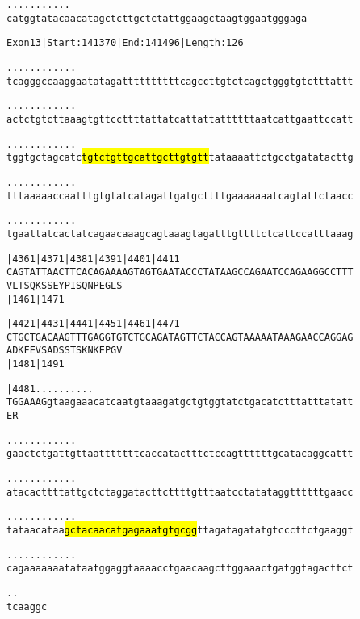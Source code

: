 \documentclass{article}
\begin{document}
\newpage
\begin{alltt}
 .    .    .    .    .    .    .    .    .    .    .
catggtatacaacatagctcttgctctattggaagctaagtggaatgggaga
\end{alltt}
\newpage
\begin{alltt}
Exon 13 | Start: 141370 | End: 141496 | Length: 126

.    .    .    .    .    .    .    .    .    .    .    .    
tcagggccaaggaatatagattttttttttcagccttgtctcagctgggtgtctttattt

.    .    .    .    .    .    .    .    .    .    .    .    
actctgtcttaaagtgttccttttattatcattattattttttaatcattgaattccatt

.    .    .    .    .    .    .    .    .    .    .    .    
tggtgctagcatc\hl{tgtctgttgcattgcttgtgtt}tataaaattctgcctgatatacttg

.    .    .    .    .    .    .    .    .    .    .    .    
tttaaaaaccaatttgtgtatcatagattgatgcttttgaaaaaaatcagtattctaacc

.    .    .    .    .    .    .    .    .    .    .    .    
tgaattatcactatcagaacaaagcagtaaagtagatttgttttctcattccatttaaag

   |4361     |4371     |4381     |4391     |4401     |4411  
CAGTATTAACTTCACAGAAAAGTAGTGAATACCCTATAAGCCAGAATCCAGAAGGCCTTT
  V  L  T  S  Q  K  S  S  E  Y  P  I  S  Q  N  P  E  G  L  S
                       |1461                         |1471  

   |4421     |4431     |4441     |4451     |4461     |4471  
CTGCTGACAAGTTTGAGGTGTCTGCAGATAGTTCTACCAGTAAAAATAAAGAACCAGGAG
  A  D  K  F  E  V  S  A  D  S  S  T  S  K  N  K  E  P  G  V
                       |1481                         |1491  

   |4481   .    .    .    .    .    .    .    .    .    .   
TGGAAAGgtaagaaacatcaatgtaaagatgctgtggtatctgacatctttatttatatt
  E  R                                                      

 .    .    .    .    .    .    .    .    .    .    .    .   
gaactctgattgttaatttttttcaccatactttctccagttttttgcatacaggcattt

 .    .    .    .    .    .    .    .    .    .    .    .   
atacacttttattgctctaggatacttcttttgtttaatcctatataggttttttgaacc

 .    .    .    .    .    .    .    .    .    .    .    .   
tataacataa\hl{gctacaacatgagaaatgtgcgg}ttagatagatatgtcccttctgaaggt

 .    .    .    .    .    .    .    .    .    .    .    .   
cagaaaaaaatataatggaggtaaaacctgaacaagcttggaaactgatggtagacttct

 .    .
tcaaggc
\end{alltt}
\end{document}
